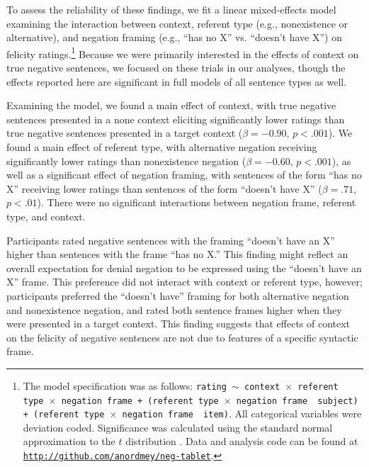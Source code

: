 \documentclass[man, noapacite]{apa2}
\begin{document}
To assess the reliability of these findings, we fit a linear mixed-effects model examining the interaction between context, referent type (e.g., nonexistence or alternative), and negation framing (e.g., ``has no X'' vs. ``doesn't have X'') on felicity ratings.\footnote{The model specification was as follows: \texttt{rating $\sim$ context~$\times$~referent type~$\times$~negation frame + (referent type~$\times$~negation frame~\textbar~subject) + (referent type~$\times$~negation frame~\textbar~item)}. All categorical variables were deviation coded. Significance was calculated using the standard normal approximation to the $t$ distribution \cite{barr2013}. Data and analysis code can be found at \href{http://github.com/anordmey/neg-tablet}{\nolinkurl{http://github.com/anordmey/neg-tablet}}.} Because we were primarily interested in the effects of context on true negative sentences, we focused on these trials in our analyses, though the effects reported here are significant in full models of all sentence types as well.

Examining the model, we found a main effect of context, with true negative sentences presented in a none context eliciting significantly lower ratings than true negative sentences presented in a target context ($\beta= -0.90$, $p< .001$). We found a main effect of referent type, with alternative negation receiving significantly lower ratings than nonexistence negation ($\beta= -0.60$, $p< .001$), as well as a significant effect of negation framing, with sentences of the form ``has no X'' receiving lower ratings than sentences of the form ``doesn't have X'' ($\beta= .71$, $p< .01$). There were no significant interactions between negation frame, referent type, and context.

Participants rated negative sentences with the framing ``doesn't have an X'' higher than sentences with the frame ``has no X.'' This finding might reflect an overall expectation for denial negation to be expressed using the ``doesn't have an X'' frame. This preference did not interact with context or referent type, however; participants preferred the ``doesn't have'' framing for both alternative negation and nonexistence negation, and rated both sentence frames higher when they were presented in a target context. This finding suggests that effects of context on the felicity of negative sentences are not due to features of a specific syntactic frame.
\end{document}
